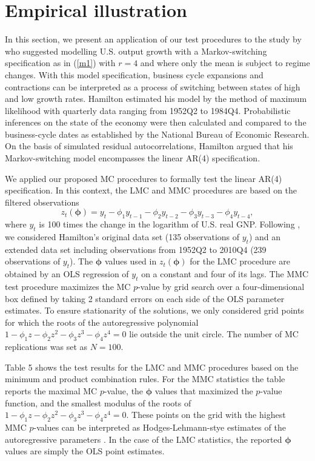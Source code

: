 \documentclass[11pt]{article}
\begin{document}
\section{Empirical illustration}

In this section, we present an application of our test procedures to the
study by \citet{Hamilton:1989} who suggested modelling U.S. output growth
with a Markov-switching specification as in (\ref{m1}) with $r=4$ and where
only the mean is subject to regime changes. With this model specification,
business cycle expansions and contractions can be interpreted as a process
of switching between states of high and low growth rates. Hamilton estimated
his model by the method of maximum likelihood with quarterly data ranging
from 1952Q2 to 1984Q4. Probabilistic inferences on the state of the economy
were then calculated and compared to the business-cycle dates as established
by the National Bureau of Economic Research. On the basis of simulated
residual autocorrelations, Hamilton argued that his Markov-switching model
encompasses the linear AR(4) specification.

We applied our proposed MC procedures to formally test the linear AR(4)
specification. In this context, the LMC and MMC procedures are based on the
filtered observations 
\begin{equation*}
z_{t}(\boldsymbol{\phi })=y_{t}-\phi _{1}y_{t-1}-\phi _{2}y_{t-2}-\phi
_{3}y_{t-3}-\phi _{4}y_{t-4},
\end{equation*}%
where $y_{t}$ is 100 times the change in the logarithm of U.S. real GNP.
Following \citet{Carrasco-Hu-Ploberger:2014}, we considered Hamilton's
original data set (135 observations of $y_{t}$) and an extended data set
including observations from 1952Q2 to 2010Q4 (239 observations of $y_{t}$).
The $\boldsymbol{\phi }$ values used in $z_{t}(\boldsymbol{\phi })$ for the
LMC procedure are obtained by an OLS regression of $y_{t}$ on a constant and
four of its lags. The MMC test procedure maximizes the MC $p$-value by grid
search over a four-dimensional box defined by taking 2 standard errors on
each side of the OLS parameter estimates. To ensure stationarity of the
solutions, we only considered grid points for which the roots of the
autoregressive polynomial $1-\phi _{1}z-\phi _{2}z^{2}-\phi _{3}z^{3}-\phi
_{4}z^{4}=0$ lie outside the unit circle. The number of MC replications was
set as $N=100$.

Table 5 shows the test results for the LMC and MMC procedures based on the
minimum and product combination rules. For the MMC statistics the table
reports the maximal MC $p$-value, the $\boldsymbol{\phi }$ values that
maximized the $p$-value function, and the smallest modulus of the roots of $%
1-\phi _{1}z-\phi _{2}z^{2}-\phi _{3}z^{3}-\phi _{4}z^{4}=0.$ These points
on the grid with the highest MMC $p$-values can be interpreted as
Hodges-Lehmann-stye estimates of the autoregressive parameters %
\citep{Hodges-Lehmann:1963}. In the case of the LMC statistics, the reported 
$\boldsymbol{\phi }$ values are simply the OLS point estimates.
\end{document}
